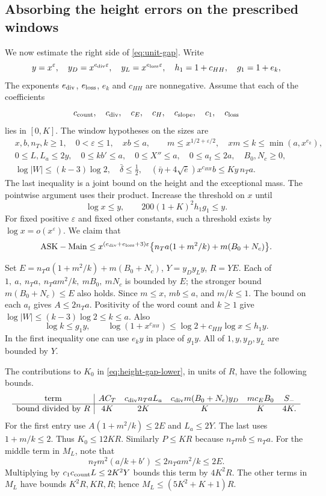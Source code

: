 \subsection{Absorbing the height errors on the prescribed windows}
\label{sec:absorb-height}
We now estimate the right side of \eqref{eq:unit-gap}. Write
\[
 y=x^\varepsilon,\quad y_D=x^{e_{\rm div}\varepsilon},\quad
 y_L=x^{e_{\rm loss}\varepsilon},\quad
 h_1=1+c_{HH},\quad g_1=1+e_k ,
\]
The exponents \(e_{\rm div}\), \(e_{\rm loss}\), \(e_k\) and \(c_{HH}\)
are nonnegative. Assume that each of the coefficients
\[
   c_{\rm count},\quad c_{\rm div},\quad c_E,\quad c_H,\quad
   c_{\rm slope},\quad c_1,\quad c_{\rm loss}
\]
lies in \([0,K]\). The window hypotheses on the sizes are
\begin{align*}
 &x,b,n_T,k\ge1,\quad 0<\varepsilon\le1,\quad xb\le a,\qquad
 m\le x^{1/2+\varepsilon/2},\quad xm\le k\le \min(a,x^{e_k}),\\
 &0\le L,L_a\le2y,\quad 0\le kb'\le a,\quad 0\le X''\le a,\quad
 0\le a_t\le2a,\quad B_0,N_c\ge0,\\
 &\log|W|\le(k-3)\log2,\quad\bar\delta\le\tfrac12,\quad
 (\bar\eta+4\sqrt{\bar e})x^{c_{HH}}b\le Ky\,n_Ta .
\end{align*}
The last inequality is a joint bound on the height and the exceptional
mass. The pointwise argument uses their product. Increase the threshold
on \(x\) until
\[
      \log x\le y,\qquad 200(1+K)^2 h_1g_1\le y .
\]
For fixed positive \(\varepsilon\) and fixed other constants, such a
threshold exists by \(\log x=o(x^\varepsilon)\).
We claim that
\begin{equation}
  \mathrm{ASK}-\mathrm{Main}
  \le x^{(e_{\rm div}+e_{\rm loss}+3)\varepsilon}
      \big\{n_Ta(1+m^2/k)+m(B_0+N_c)\big\}.
 \label{eq:height-power}
\end{equation}

Set \(E=n_Ta(1+m^2/k)+m(B_0+N_c)\), \(Y=y_Dy_Ly\),
\(R=YE\). Each of \(1,\ a,\ n_Ta,\ n_Ta m^2/k,\ mB_0,\ mN_c\)
is bounded by \(E\); the stronger bound \(m(B_0+N_c)\le E\)
also holds. Since \(m\le x\), \(mb\le a\), and \(m/k\le1\).
The bound on each \(a_t\) gives \(A\le2n_Ta\). Positivity of the
word count and \(k\ge1\) give
\(\log|W|\le (k-3)\log2\le k\le a\). Also
\[
 \log k\le g_1 y,\qquad
 \log(1+x^{c_{HH}})\le \log 2+c_{HH}\log x\le h_1 y .
\]
In the first inequality one can use \(e_k y\) in place of \(g_1 y\).
All of \(1,y,y_D,y_L\) are bounded by \(Y\).

The contributions to \(K_0\) in \eqref{eq:height-gap-lower}, in units of
\(R\), have the following bounds.
\[
 \begin{array}{c|ccccc}
 \text{term}&AC_T& c_{\rm div}n_Ta L_a&
 c_{\rm div}m(B_0+N_c)y_D&mc_EB_0&S_-\\ \hline
 \text{bound divided by }R&4K&2K&K&K&4K .
 \end{array}
\]
For the first entry use
\(A(1+m^2/k)\le2E\) and \(L_a\le2Y\).
The last uses \(1+m/k\le2\). Thus \(K_0\le12KR\).
Similarly \(P\le KR\) because \(n_Tmb\le n_Ta\).
For the middle term in \(M_L\), note that
\[
 n_Tm^2(a/k+b')\le 2n_Tam^2/k\le2E.
\]
Multiplying by \(c_1 c_{\rm count}L\le2K^2Y\) bounds this term
by \(4K^2R\). The other terms in \(M_L\) have bounds \(K^2R,KR,R\);
hence \(M_L\le(5K^2+K+1)R\).

